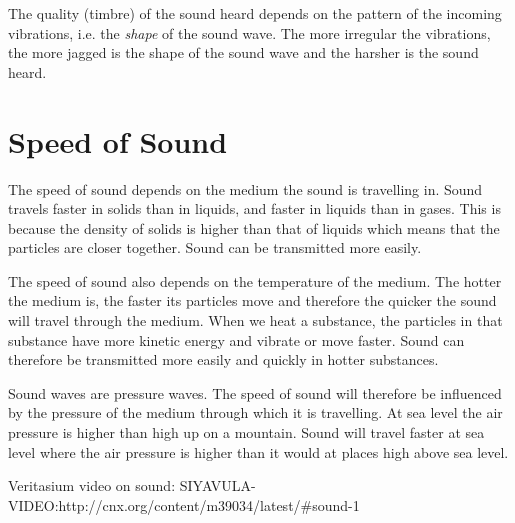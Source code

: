 The quality (timbre) of the sound heard depends on the pattern of the incoming vibrations, i.e. the \textit{shape} of the sound wave. The more irregular the vibrations, the more jagged is the shape of the sound wave and the harsher is the sound heard.

\section{Speed of Sound}
The speed of sound depends on the medium the sound is travelling in. Sound travels faster in solids than in liquids, and faster in liquids than in gases. This is because the density of solids is higher than that of liquids which means that the particles are closer together. Sound can be transmitted more easily.

The speed of sound also depends on the temperature of the medium. The hotter the medium is, the faster its particles move and therefore the quicker the sound will travel through the medium. When we heat a substance, the particles in that substance have more kinetic energy and vibrate or move faster. Sound can therefore be transmitted more easily and quickly in hotter substances.

Sound waves are pressure waves. The speed of sound will therefore be influenced by the pressure of the medium through which it is travelling. At sea level the air pressure is higher than high up on a mountain. Sound will travel faster at sea level where the air pressure is higher than it would at places high above sea level.


Veritasium video on sound: SIYAVULA-VIDEO:http://cnx.org/content/m39034/latest/#sound-1
